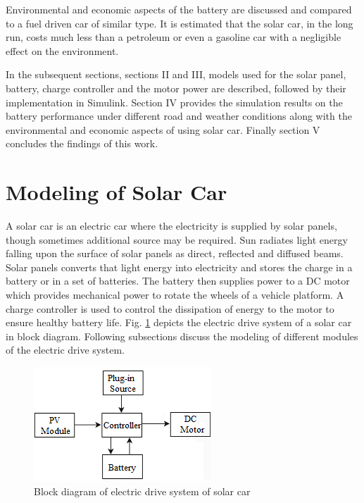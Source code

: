 \documentclass[journal]{IEEEtran/IEEEtran}
\newcommand{\figref}[1]{Fig. \ref{#1}}
\begin{document}
	Environmental and economic aspects of the battery are discussed and compared to a fuel driven car of similar type. It is estimated that the solar car, in the long run, costs much less than a petroleum or even a gasoline car with a negligible effect on the environment. 
	
	
	In the subsequent sections, sections II and III, models used for the solar panel, battery, charge controller and the motor power are described, followed by their implementation in Simulink. Section IV provides the simulation results on the battery performance under different road and weather conditions along with the environmental and economic aspects of using solar car. Finally section V concludes the findings of this work.
	
	\section{Modeling of Solar Car}
	A solar car is an electric car where the electricity is supplied by solar panels, though sometimes additional source may be required. Sun radiates light energy falling upon the surface of solar panels as direct, reflected and diffused beams. Solar panels converts that light energy into electricity and stores the charge in a battery or in a set of batteries. The battery then supplies power to a DC motor which provides mechanical power to rotate the wheels of a vehicle platform. A charge controller is used to control the dissipation of energy to the motor to ensure healthy battery life. \figref{fig:system_block} depicts the electric drive system of a solar car in block diagram. Following subsections discuss the modeling of different modules of the electric drive system.
	\begin{figure}[!tb]
		\centering
		\includegraphics[width=\linewidth]{system_block.png}
		\caption{Block diagram of electric drive system of solar car}
		\label{fig:system_block}
	\end{figure}
\end{document}
